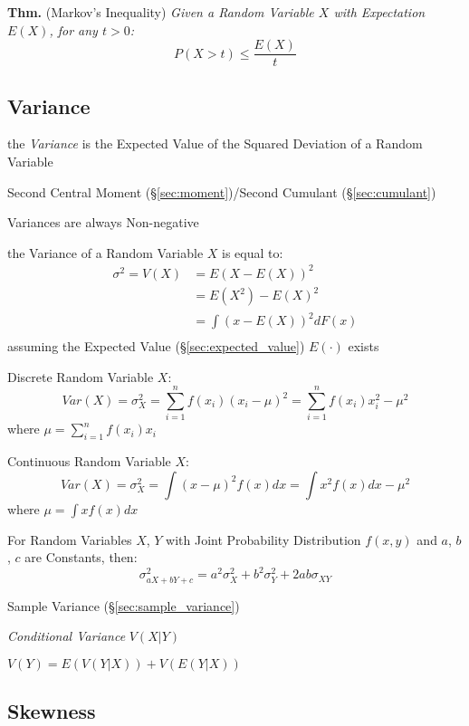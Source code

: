 \textbf{Thm.} (Markov's Inequality) \emph{
  Given a Random Variable $X$ with Expectation $E(X)$, for any $t > 0$:
  \[
    P(X > t) \leq \frac{E(X)}{t}
  \]
}



\subsection{Variance}\label{sec:variance}

the \emph{Variance} is the Expected Value of the Squared Deviation of a Random
Variable

Second Central Moment (\S\ref{sec:moment})/Second Cumulant
(\S\ref{sec:cumulant})

Variances are always Non-negative

the Variance of a Random Variable $X$ is equal to:
\begin{align*}
  \sigma^2 = V(X) & = E(X - E(X))^2   \\
                  & = E(X^2) - E(X)^2 \\
                  & = \int(x - E(X))^2 dF(x) \\
\end{align*}
assuming the Expected Value (\S\ref{sec:expected_value}) $E(\cdot)$ exists

Discrete Random Variable $X$:
\[
  Var(X) = \sigma_X^2 = \sum_{i=1}^n f(x_i) (x_i - \mu)^2 = \sum_{i=1}^n
  f(x_i) x_i^2 - \mu^2
\]
where $\mu = \sum_{i=1}^n f(x_i) x_i$

Continuous Random Variable $X$:
\[
  Var(X) = \sigma_X^2 = \int (x - \mu)^2 f(x) dx = \int x^2 f(x) dx -
  \mu^2
\]
where $\mu = \int x f(x) dx$

For Random Variables $X$, $Y$ with Joint Probability Distribution
$f(x,y)$ and $a$, $b$, $c$ are Constants, then:
\[
  \sigma^2_{a X + b Y + c} = a^2 \sigma^2_X + b^2 \sigma^2_Y + 2ab
  \sigma_{X Y}
\]

\fist Sample Variance (\S\ref{sec:sample_variance})

\emph{Conditional Variance} $V(X|Y)$

$V(Y) = E(V(Y|X)) + V(E(Y|X))$



\subsection{Skewness}\label{sec:skewness}

